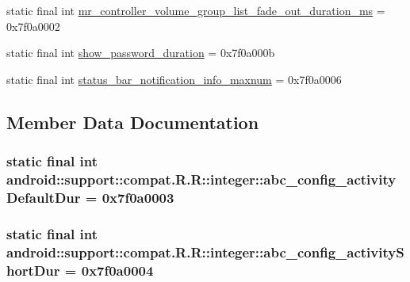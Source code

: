 \begin{CompactItemize}
\item 
static final int \hyperlink{classandroid_1_1support_1_1compat_1_1_r_1_1integer_7f1b5ef92941bad1483f32d36818a567}{mr\_\-controller\_\-volume\_\-group\_\-list\_\-fade\_\-out\_\-duration\_\-ms} = 0x7f0a0002
\item 
static final int \hyperlink{classandroid_1_1support_1_1compat_1_1_r_1_1integer_1c5d7d83b6ada846c69099b16244090f}{show\_\-password\_\-duration} = 0x7f0a000b
\item 
static final int \hyperlink{classandroid_1_1support_1_1compat_1_1_r_1_1integer_f51795c184e75e1fd6bcf99c15f3b640}{status\_\-bar\_\-notification\_\-info\_\-maxnum} = 0x7f0a0006
\end{CompactItemize}


\subsection{Member Data Documentation}
\hypertarget{classandroid_1_1support_1_1compat_1_1_r_1_1integer_1225dc4206d16b016a4e3b969fb3c448}{
\subsubsection[{abc\_\-config\_\-activityDefaultDur}]{\setlength{\rightskip}{0pt plus 5cm}static final int android::support::compat.R.R::integer::abc\_\-config\_\-activityDefaultDur = 0x7f0a0003}}
\label{classandroid_1_1support_1_1compat_1_1_r_1_1integer_1225dc4206d16b016a4e3b969fb3c448}


\hypertarget{classandroid_1_1support_1_1compat_1_1_r_1_1integer_3b16f1a767b45a4be2ab5f726a04f9c8}{
\subsubsection[{abc\_\-config\_\-activityShortDur}]{\setlength{\rightskip}{0pt plus 5cm}static final int android::support::compat.R.R::integer::abc\_\-config\_\-activityShortDur = 0x7f0a0004}}
\label{classandroid_1_1support_1_1compat_1_1_r_1_1integer_3b16f1a767b45a4be2ab5f726a04f9c8}


